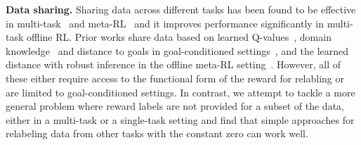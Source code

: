 \textbf{Data sharing.} 
Sharing data across different tasks has been found to be effective in multi-task~\citep{eysenbach2020rewriting,kalashnikov2021mt,yu2021conservative} and meta-RL~\citep{dorfman2020offline,mitchell2021offline} and it improves performance significantly in multi-task offline RL. 
Prior works share data based on learned Q-values~\citep{eysenbach2020rewriting,li2020generalized,yu2021conservative}, domain knowledge~\citep{kalashnikov2021mt} and distance to goals in goal-conditioned settings~\citep{andrychowicz2017hindsight,liu2019competitive,sun2019policy,lin2019reinforcement,chebotar2021actionable}, and the learned distance with robust inference in the offline meta-RL setting~\citep{li2019multi}. However, all of these either require access to the functional form of the reward for relabling or are limited to goal-conditioned settings. In contrast, we attempt to tackle a more general problem where reward labels are not provided for a subset of the data, either in a  multi-task or a single-task setting and find that simple approaches for relabeling data from other tasks with the constant zero can work well. 
